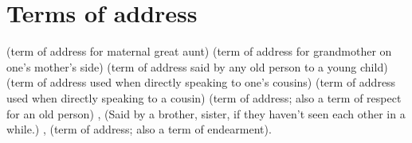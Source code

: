 \section{Terms of address} \label{terms of address (list)}
\begin{multicols}{2}
 
  (term of address for maternal great aunt)
  (term of address for grandmother on one’s mother’s side)
  (term of address said by any old person to a young child)
  (term of address used when directly speaking to one’s cousins)
 
  (term of address used when directly speaking to a cousin)
 
 
 
  (term of address; also a term of respect for an old person)
 , 
 
 
 
  (Said by a brother, sister, if they haven’t seen each other in a while.)
 ,  (term of address; also a term of \linebreak  endearment).
\end{multicols}


